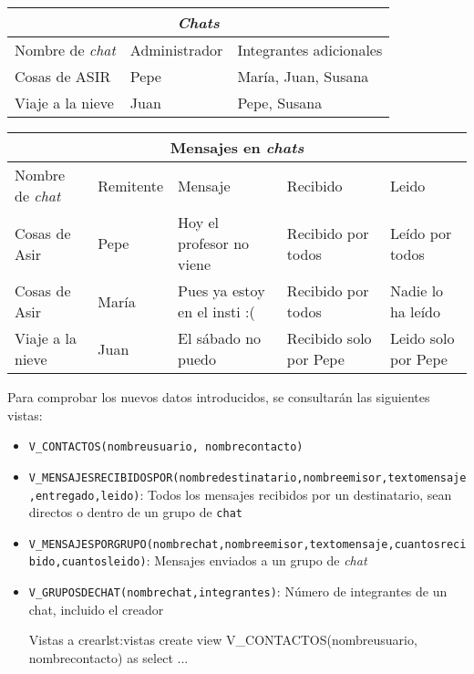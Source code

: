 \begin{homeworkProblem}
  \begin{tabular}{|l|l|l|}
    \hline
    \multicolumn{3}{|c|}{\textit{Chats}} \\
    \hline
    Nombre de \textit{chat} & Administrador & Integrantes adicionales \\
    \hline
    Cosas de ASIR & Pepe & María, Juan, Susana \\
    Viaje a la nieve & Juan & Pepe, Susana \\
    \hline
  \end{tabular}

  
  \begin{tabular}{|l|l|l|l|l|}
    \hline
    \multicolumn{5}{|c|}{Mensajes en \textit{chats}} \\
    \hline
    Nombre de \textit{chat} & Remitente & Mensaje & Recibido & Leido \\
    \hline
    Cosas de Asir & Pepe & Hoy el profesor no viene & Recibido por todos & Leído por todos \\
    Cosas de Asir & María & Pues ya estoy en el insti :( & Recibido por todos & Nadie lo ha leído \\
    Viaje a la nieve & Juan & El sábado no puedo & Recibido solo por Pepe & Leido solo por Pepe \\
    \hline
  \end{tabular}
  

  

  Para comprobar los nuevos datos introducidos, se consultarán las siguientes vistas:
  
  \begin{itemize}
  \item \texttt{V\_CONTACTOS(nombreusuario, nombrecontacto)}
  
  \item \texttt{V\_MENSAJESRECIBIDOSPOR(nombredestinatario,nombreemisor,textomensaje,entregado,leido)}: Todos los mensajes recibidos por un destinatario, sean directos o dentro de un grupo de \texttt{chat}
  \item \texttt{V\_MENSAJESPORGRUPO(nombrechat,nombreemisor,textomensaje,cuantosrecibido,cuantosleido)}: Mensajes enviados a un grupo de \textit{chat}
    
  \item \texttt{V\_GRUPOSDECHAT(nombrechat,integrantes)}: Número de integrantes de un chat, incluido el creador

  \begin{listadosql}{Vistas a crear}{lst:vistas}
  create view V_CONTACTOS(nombreusuario, nombrecontacto) as
  select ...
  

\end{listadosql}
\end{itemize}
\end{homeworkProblem}
